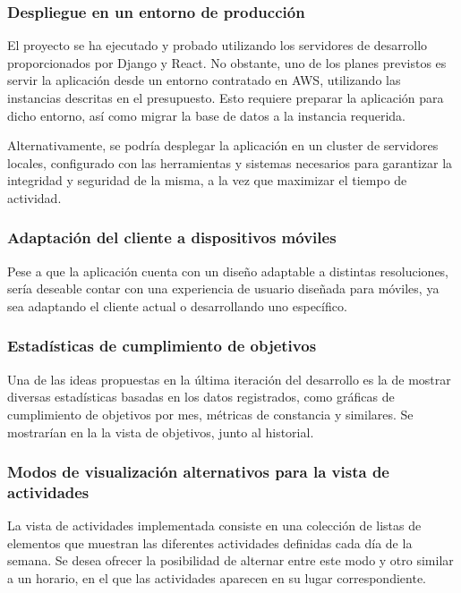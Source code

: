 \documentclass[10pt, a4paper]{aqademic}
\begin{document}
\subsubsection*{Despliegue en un entorno de producción}

El proyecto se ha ejecutado y probado utilizando los servidores de desarrollo proporcionados por Django y React. No obstante, uno de los planes previstos es 
servir la aplicación desde un entorno contratado en AWS, utilizando las instancias descritas en el presupuesto. Esto requiere preparar la aplicación para dicho entorno, así como migrar la base de datos a la instancia requerida.

Alternativamente, se podría desplegar la aplicación en un cluster de servidores locales, configurado con las herramientas y sistemas necesarios para garantizar la integridad y seguridad de la misma, a la vez que maximizar el tiempo de actividad.


\subsubsection*{Adaptación del cliente a dispositivos móviles}

Pese a que la aplicación cuenta con un diseño adaptable a distintas resoluciones, sería deseable contar con una experiencia de usuario diseñada para móviles, ya sea adaptando el cliente actual o desarrollando uno específico.


\subsubsection*{Estadísticas de cumplimiento de objetivos}

Una de las ideas propuestas en la última iteración del desarrollo es la de mostrar diversas estadísticas basadas en los datos registrados, como gráficas de cumplimiento de objetivos por mes, métricas de constancia y similares. Se mostrarían en la la vista de objetivos, junto al historial.


\subsubsection*{Modos de visualización alternativos para la vista de actividades}

La vista de actividades implementada consiste en una colección de listas de elementos que muestran las diferentes actividades definidas cada día de la semana. Se desea ofrecer la posibilidad de alternar entre este modo y otro similar a un horario, en el que las actividades aparecen en su lugar correspondiente.


\newpage



\end{document}
